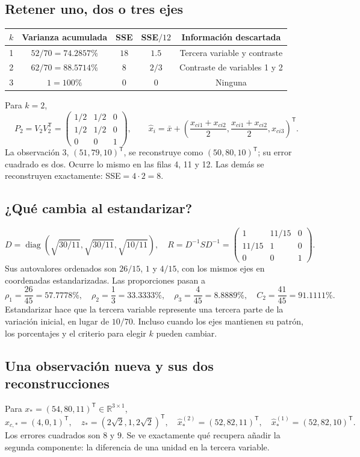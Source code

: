 \documentclass[11pt,a4paper]{article}
\newcommand{\R}{\mathbb R}
\newcommand{\T}{^{\mathsf T}}
\DeclareMathOperator{\diag}{diag}
\theoremstyle{definition}
\begin{document}
\subsection{Retener uno, dos o tres ejes}
\begin{center}\small
\begin{tabular}{ccccc}\toprule
$k$ & Varianza acumulada & SSE & SSE$/12$ & Información descartada\\\midrule
1 & $52/70=74.2857\%$ & $18$ & $1.5$ & Tercera variable y contraste\\
2 & $62/70=88.5714\%$ & $8$ & $2/3$ & Contraste de variables 1 y 2\\
3 & $1=100\%$ & $0$ & $0$ & Ninguna\\\bottomrule
\end{tabular}\end{center}
Para $k=2$,
\[
P_2=V_2V_2\T=\begin{pmatrix}1/2&1/2&0\\1/2&1/2&0\\0&0&1\end{pmatrix},\qquad
\widehat x_i=\bar x+\left(\frac{x_{ci1}+x_{ci2}}2,\frac{x_{ci1}+x_{ci2}}2,x_{ci3}\right)\T.
\]
La observación 3, $(51,79,10)\T$, se reconstruye como $(50,80,10)\T$; su error cuadrado es dos. Ocurre lo mismo en las filas 4, 11 y 12. Las demás se reconstruyen exactamente: SSE$=4\cdot2=8$.
\subsection{¿Qué cambia al estandarizar?}
\[
D=\diag\left(\sqrt{30/11},\sqrt{30/11},\sqrt{10/11}\right),\quad
R=D^{-1}SD^{-1}=\begin{pmatrix}1&11/15&0\\11/15&1&0\\0&0&1\end{pmatrix}.
\]
Sus autovalores ordenados son $26/15$, $1$ y $4/15$, con los mismos ejes en coordenadas estandarizadas. Las proporciones pasan a
\[
\rho_1=\frac{26}{45}=57.7778\%,\quad\rho_2=\frac13=33.3333\%,\quad
\rho_3=\frac4{45}=8.8889\%,\quad C_2=\frac{41}{45}=91.1111\%.
\]
Estandarizar hace que la tercera variable represente una tercera parte de la variación inicial, en lugar de $10/70$. Incluso cuando los ejes mantienen su patrón, los porcentajes y el criterio para elegir $k$ pueden cambiar.
\subsection{Una observación nueva y sus dos reconstrucciones}
Para $x_*=(54,80,11)\T\in\R^{3\times1}$,
\[
x_{c,*}=(4,0,1)\T,\quad z_*=(2\sqrt2,1,2\sqrt2)\T,\quad
\widehat x_*^{(2)}=(52,82,11)\T,\quad\widehat x_*^{(1)}=(52,82,10)\T.
\]
Los errores cuadrados son $8$ y $9$. Se ve exactamente qué recupera añadir la segunda componente: la diferencia de una unidad en la tercera variable.
\end{document}
